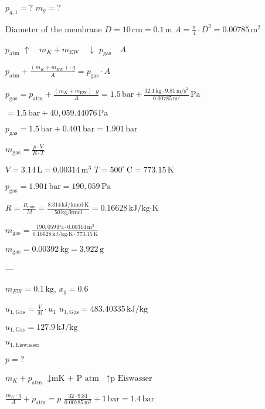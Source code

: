 \( p_{g,1} = ? \)  
\( m_g = ? \)  

Diameter of the membrane \( D = 10 \, \text{cm} = 0.1 \, \text{m} \)  
\( A = \frac{\pi}{4} \cdot D^2 = 0.00785 \, \text{m}^2 \)  

\( p_{\text{atm}} \)  
\(\uparrow \quad m_K + m_{\text{EW}} \quad \downarrow \)  
\( p_{\text{gas}} \quad A \)  

\( p_{\text{atm}} + \frac{(m_K + m_{\text{EW}}) \cdot g}{A} = p_{\text{gas}} \cdot A \)  

\( p_{\text{gas}} = p_{\text{atm}} + \frac{(m_K + m_{\text{EW}}) \cdot g}{A} = 1.5 \, \text{bar} + \frac{32.1 \, \text{kg} \cdot 9.81 \, \text{m/s}^2}{0.00785 \, \text{m}^2} \, \text{Pa} \)  

\( = 1.5 \, \text{bar} + 40,059.44076 \, \text{Pa} \)  

\( p_{\text{gas}} = 1.5 \, \text{bar} + 0.401 \, \text{bar} = 1.901 \, \text{bar} \)  

\( m_{\text{gas}} = \frac{p \cdot V}{R \cdot T} \)  

\( V = 3.14 \, \text{L} = 0.00314 \, \text{m}^3 \)  
\( T = 500^\circ \, \text{C} = 773.15 \, \text{K} \)  

\( p_{\text{gas}} = 1.901 \, \text{bar} = 190,059 \, \text{Pa} \)  

\( R = \frac{R_{\text{univ}}}{M} = \frac{8.314 \, \text{kJ/kmol·K}}{50 \, \text{kg/kmol}} = 0.16628 \, \text{kJ/kg·K} \)  

\( m_{\text{gas}} = \frac{190,059 \, \text{Pa} \cdot 0.00314 \, \text{m}^3}{0.16628 \, \text{kJ/kg·K} \cdot 773.15 \, \text{K}} \)  

\( m_{\text{gas}} = 0.00392 \, \text{kg} = 3.922 \, \text{g} \)  

---

\( m_{EW} = 0.1 \, \text{kg} \), \( x_{g} = 0.6 \)  

\( u_{1, \text{Gas}} = \frac{V}{M} \cdot u_{1} \)  
\( u_{1, \text{Gas}} = 483.40335 \, \text{kJ/kg} \)  

\( u_{1, \text{Gas}} = 127.9 \, \text{kJ/kg} \)  

\( u_{1, \text{Eiswasser}} \)  

\( p = ? \)  

\( m_{K} + p_{\text{atm}} \)  
\( \downarrow \text{mK + P atm} \)  
\( \uparrow \text{p Eiswasser} \)  

\( \frac{m_{K} \cdot g}{A} + p_{\text{atm}} = p \)  
\( \frac{32 \cdot 9.81}{0.00785 \, \text{m}^2} + 1 \, \text{bar} = 1.4 \, \text{bar} \)  

